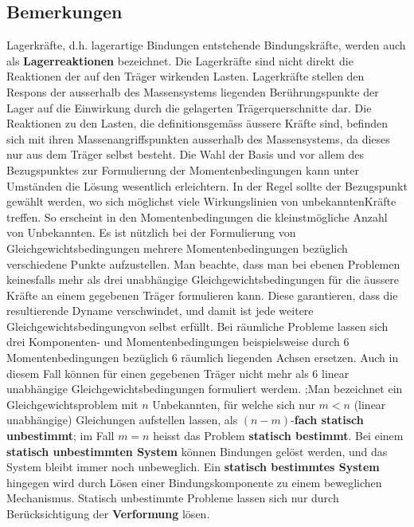 \subsection{Bemerkungen}
Lagerkräfte, d.h. lagerartige Bindungen entstehende Bindungskräfte, werden auch als \textbf{Lagerreaktionen} bezeichnet. Die Lagerkräfte sind nicht direkt die Reaktionen der auf den Träger wirkenden Lasten. Lagerkräfte stellen den Respons der ausserhalb des Massensystems liegenden Berührungspunkte der Lager auf die Einwirkung durch die gelagerten Trägerquerschnitte dar. Die Reaktionen zu den Lasten, die definitionsgemäss äussere Kräfte sind, befinden sich mit ihren Massenangriffspunkten ausserhalb des Massensystems, da dieses nur aus dem Träger selbst besteht.
\newline\newline
Die Wahl der Basis und vor allem des Bezugspunktes zur Formulierung der Momentenbedingungen kann unter Umständen die Lösung wesentlich erleichtern. In der Regel sollte der Bezugspunkt gewählt werden, wo sich möglichst viele Wirkungslinien von unbekanntenKräfte treffen. So erscheint in den Momentenbedingungen die kleinstmögliche Anzahl von Unbekannten.  
\newline\newline
Es ist nützlich bei der Formulierung von Gleichgewichtsbedingungen mehrere Momentenbedingungen bezüglich verschiedene Punkte aufzustellen. Man beachte, dass man bei ebenen Problemen keinesfalls mehr als drei unabhängige Gleichgewichtsbedingungen für die äussere Kräfte an einem gegebenen Träger formulieren kann. Diese garantieren, dass die resultierende Dyname verschwindet, und damit ist jede weitere Gleichgewichtsbedingungvon selbst erfüllt.
\newline\newline
Bei räumliche Probleme lassen sich drei Komponenten- und Momentenbedingungen beispielsweise durch 6 Momentenbedingungen bezüglich 6 räumlich liegenden Achsen ersetzen. Auch in diesem Fall können für einen gegebenen Träger nicht mehr als 6 linear unabhängige Gleichgewichtsbedingungen formuliert werdem. 
\newline\newline
;Man bezeichnet ein Gleichgewichtsproblem mit $n$ Unbekannten, für welche sich nur $m<n$ (linear unabhängige) Gleichungen aufstellen lassen, als $(n-m)$-\textbf{fach statisch unbestimmt}; im Fall $m=n$ heisst das Problem \textbf{statisch bestimmt}. Bei einem \textbf{statisch unbestimmten System} können Bindungen gelöst werden, und das System bleibt immer noch unbeweglich. Ein \textbf{statisch bestimmtes System} hingegen wird durch Lösen einer Bindungskomponente zu einem beweglichen Mechanismus. Statisch unbestimmte Probleme lassen sich nur durch Berücksichtigung der \textbf{Verformung} lösen.
